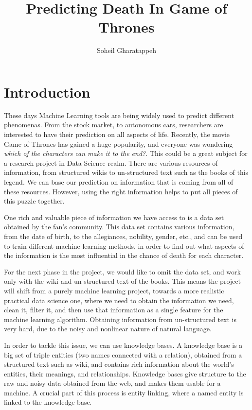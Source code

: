 \documentclass[letterpaper]{article}
\title{Predicting Death In Game of Thrones}
\author{Soheil Gharatappeh}
\begin{document}
\maketitle
	
	


\section{Introduction}
These days Machine Learning tools are being widely used to predict different phenomenas. From the stock market, to autonomous cars, researchers are interested to have their prediction on all aspects of life. Recently, the movie Game of Thrones has gained a huge popularity, and everyone was wondering \textit{which of the characters can make it to the end?}. This could be a great subject for a research project in Data Science realm. There are various resources of information, from structured wikis to un-structured text such as the books of this legend. We can base our prediction on information that is coming from all of these resources. However, using the right information helps to put all pieces of this puzzle together.


One rich and valuable piece of information we have access to is a data set obtained by the fan's community. This data set contains various information, from the date of birth, to the allegiances, nobility, gender, etc., and can be used to train different machine learning methods, in order to find out what aspects of the information is the most influential in the chance of death for each character.


For the next phase in the project, we would like to omit the data set, and work only with the wiki and un-structured text of the books. This means the project will shift from a purely machine learning project, towards a more realistic practical data science one, where we need to obtain the information we need, clean it, filter it, and then use that information as a single feature for the machine learning algorithm. Obtaining information from un-structured text is very hard, due to the noisy and nonlinear nature of natural language. 


In order to tackle this issue, we can use knowledge bases. A knowledge base is a big set of triple entities (two names connected with a relation), obtained from a structured text such as wiki, and contains rich information about the world's entities, their meanings, and relationships. Knowledge bases give structure to the raw and noisy data obtained from the web, and makes them usable for a machine. A crucial part of this process is entity linking, where a named entity is linked to the knowledge base.
\end{document}

